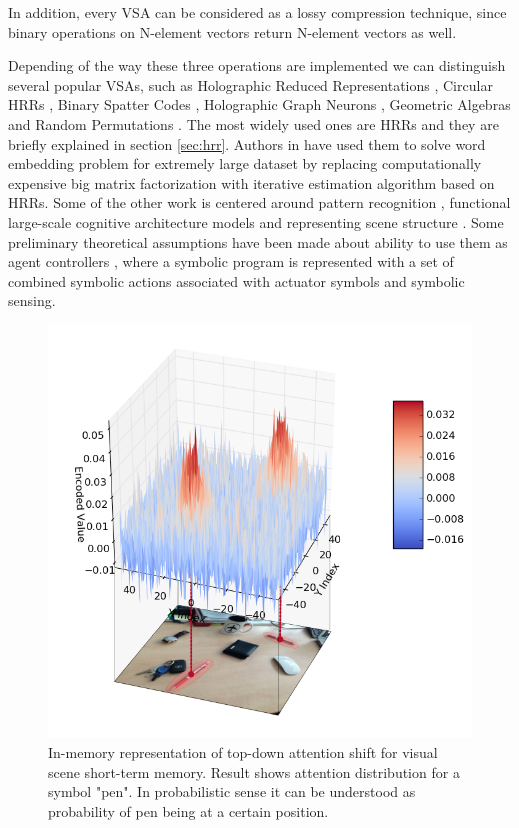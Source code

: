 \documentclass[conference]{IEEEtran}
\begin{document}
	In addition, every VSA can be considered as a lossy compression technique, since binary operations on N-element vectors return N-element vectors as well.
	
	Depending of the way these three operations are implemented we can distinguish several popular VSAs, such as Holographic Reduced Representations \cite{Plate:1995:HolographicReducedRepresentations}, Circular HRRs \cite{DeVine:2010:Semanticoscillations}, Binary Spatter Codes \cite{Kanerva:1994:SpatterCodeEncoding}, Holographic Graph Neurons \cite{Kleyko:2016:HolographicGraphNeuron}, Geometric Algebras \cite{Patyk-Lonska:2011:DistributedRepresentationsBased} and Random Permutations \cite{Recchia:2015:EncodingSequentialInformation}.
The most widely used ones are HRRs and they are briefly explained in section \ref{sec:hrr}.
Authors in \cite{Golosio:2015:CognitiveNeuralArchitecture} have used them to solve word embedding problem for extremely large dataset by replacing computationally expensive big matrix factorization with iterative estimation algorithm based on HRRs.
Some of the other work is centered around pattern recognition \cite{Kleyko:2016:PatternRecognitionVector}, functional large-scale cognitive architecture models \cite{Eliasmith:2012:LargeScaleModel} and representing scene structure \cite{scene-structure}.
Some preliminary theoretical assumptions have been made about ability to use them as agent controllers \cite{Levy:2013:LearningBehaviorHierarchies}, where a symbolic program is represented with a set of combined symbolic actions associated with actuator symbols and symbolic sensing.
	
	
	\begin{figure}
		\center
		\includegraphics[width=0.9\columnwidth]{img/probe_for_pen_w_img.png}
		\caption{In-memory representation of top-down attention shift for visual scene short-term memory. Result shows attention distribution for a symbol "pen". In probabilistic sense it can be understood as probability of pen being at a certain position.}
	\end{figure}
	
\end{document}
